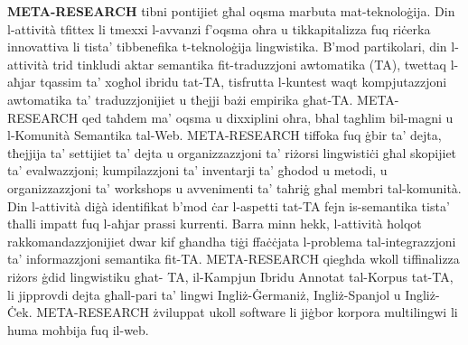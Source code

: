 \documentclass[]{../../metanetpaper}
\begin{document}
\begin{multicols}{2}
\textbf{META-RESEARCH} tibni pontijiet għal oqsma marbuta mat-teknoloġija. Din l-attività tfittex li tmexxi l-avvanzi f'oqsma oħra u tikkapitalizza fuq riċerka innovattiva li tista’ tibbenefika t-teknoloġija lingwistika. B’mod partikolari, din l-attività trid tinkludi aktar semantika fit-traduzzjoni awtomatika (TA), twettaq l-aħjar tqassim ta’ xogħol ibridu tat-TA, tisfrutta l-kuntest waqt  kompjutazzjoni awtomatika ta’ traduzzjonijiet u tħejji bażi empirika għat-TA. META-RESEARCH qed taħdem ma’ oqsma u dixxiplini oħra, bħal tagħlim bil-magni u l-Komunità Semantika tal-Web. META-RESEARCH tiffoka fuq ġbir ta’ dejta, tħejjija ta’  settijiet ta’ dejta u organizzazzjoni ta’ riżorsi lingwistiċi għal skopijiet ta’ evalwazzjoni; kumpilazzjoni ta’ inventarji ta’ għodod u metodi, u organizzazzjoni ta’ workshops u avvenimenti ta’ taħriġ għal membri tal-komunità. Din l-attività diġà identifikat b’mod ċar l-aspetti tat-TA fejn is-semantika tista’ tħalli impatt fuq l-aħjar prassi kurrenti. Barra minn hekk, l-attività ħolqot rakkomandazzjonijiet dwar kif għandha tiġi ffaċċjata l-problema tal-integrazzjoni ta’ informazzjoni semantika fit-TA. META-RESEARCH qiegħda wkoll tiffinalizza riżors ġdid lingwistiku għat- TA, il-Kampjun Ibridu Annotat tal-Korpus tat-TA, li jipprovdi dejta għall-pari ta’ lingwi Ingliż-Ġermaniż, Ingliż-Spanjol u Ingliż-Ċek. META-RESEARCH żviluppat ukoll software li jiġbor korpora multilingwi li huma moħbija fuq il-web.

\end{multicols}


\setcounter{section}{0}
\setcounter{figure}{0}

\cleardoublepage


\end{document}
